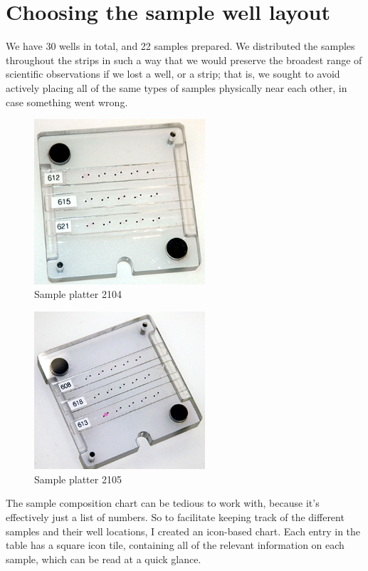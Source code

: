 \section{Choosing the sample well layout}\label{choosing-the-sample-well-layout}
We have 30 wells in total, and 22 samples prepared. We distributed the samples
throughout the strips in such a way that we would preserve the broadest range of
scientific observations if we lost a well, or a strip; that is, we sought to
avoid actively placing all of the same types of samples physically near each
other, in case something went wrong.

\begin{figure}
\begin{center}
\includegraphics[width=2.5in]{./images/ace_m2_sample_tiles/platter_2104_web.png}
\caption{Sample platter 2104}
\end{center}
\end{figure}

\begin{figure}
\begin{center}
\includegraphics[width=2.5in]{./images/ace_m2_sample_tiles/platter_2105_web.png}
\caption{Sample platter 2105}
\end{center}
\end{figure}

The sample composition chart can be tedious to work with, because it's
effectively just a list of numbers. So to facilitate keeping track of the
different samples and their well locations, I created an icon-based chart. Each
entry in the table has a square icon tile, containing all of the relevant
information on each sample, which can be read at a quick glance.

